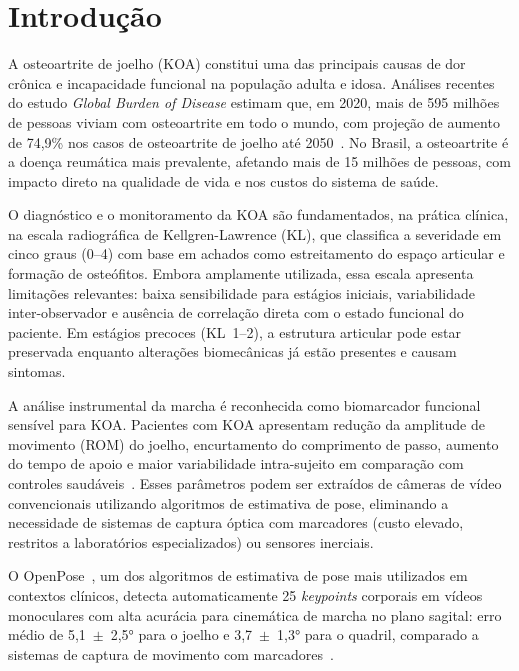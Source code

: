 \documentclass[a4paper,12pt]{article}
\begin{document}
\newpage
\setcounter{page}{1}
\tableofcontents
\newpage

\section{Introdução}

A osteoartrite de joelho (KOA) constitui uma das principais causas de dor crônica
e incapacidade funcional na população adulta e idosa. Análises recentes do estudo
\textit{Global Burden of Disease} estimam que, em 2020, mais de 595 milhões de
pessoas viviam com osteoartrite em todo o mundo, com projeção de aumento de 74,9\%
nos casos de osteoartrite de joelho até 2050~\cite{GBD2023}. No Brasil, a
osteoartrite é a doença reumática mais prevalente, afetando mais de 15 milhões de
pessoas, com impacto direto na qualidade de vida e nos custos do sistema de saúde.

O diagnóstico e o monitoramento da KOA são fundamentados, na prática clínica, na
escala radiográfica de Kellgren-Lawrence (KL), que classifica a severidade em cinco
graus (0--4) com base em achados como estreitamento do espaço articular e formação de
osteófitos. Embora amplamente utilizada, essa escala apresenta limitações relevantes:
baixa sensibilidade para estágios iniciais, variabilidade inter-observador e ausência
de correlação direta com o estado funcional do paciente. Em estágios precoces
(KL~1--2), a estrutura articular pode estar preservada enquanto alterações
biomecânicas já estão presentes e causam sintomas.

A análise instrumental da marcha é reconhecida como biomarcador funcional sensível
para KOA. Pacientes com KOA apresentam redução da amplitude de movimento (ROM) do
joelho, encurtamento do comprimento de passo, aumento do tempo de apoio e maior
variabilidade intra-sujeito em comparação com controles saudáveis~\cite{Stenum2021,
Washabaugh2022}. Esses parâmetros podem ser extraídos de câmeras de vídeo
convencionais utilizando algoritmos de estimativa de pose, eliminando a necessidade
de sistemas de captura óptica com marcadores (custo elevado, restritos a laboratórios
especializados) ou sensores inerciais.

O OpenPose~\cite{Cao2021}, um dos algoritmos de estimativa de pose mais utilizados
em contextos clínicos, detecta automaticamente 25 \textit{keypoints} corporais em
vídeos monoculares com alta acurácia para cinemática de marcha no plano sagital:
erro médio de 5,1~$\pm$~2,5° para o joelho e 3,7~$\pm$~1,3° para o quadril,
comparado a sistemas de captura de movimento com
marcadores~\cite{Washabaugh2022}.
\end{document}
